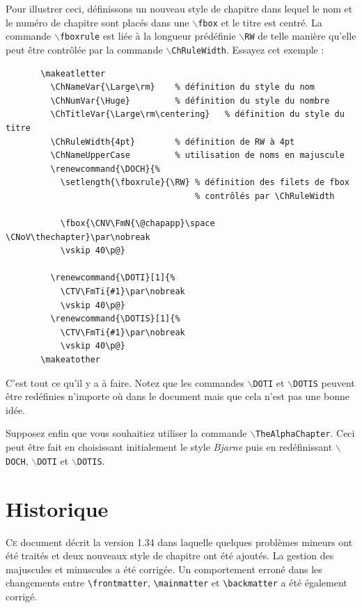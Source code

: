 \documentclass{report}
\newcommand{\A}[1]{{$\backslash${\tt #1}}}
\begin{document}
    Pour illustrer ceci, définissons un nouveau style de chapitre dans lequel
    le nom et le numéro de chapitre sont placés dans une \A{fbox} et le titre
    est centré.
    La commande \A{fboxrule} est liée à la longueur prédéfinie \A{RW} de telle
    manière qu'elle peut être contrôlée par la commande \A{ChRuleWidth}. 
    Essayez cet exemple :
    \begin{verbatim}
       \makeatletter
         \ChNameVar{\Large\rm}    % définition du style du nom
         \ChNumVar{\Huge}         % définition du style du nombre
         \ChTitleVar{\Large\rm\centering}   % définition du style du titre
         \ChRuleWidth{4pt}        % définition de RW à 4pt
         \ChNameUpperCase         % utilisation de noms en majuscule
         \renewcommand{\DOCH}{%
           \setlength{\fboxrule}{\RW} % définition des filets de fbox 
                                      % contrôlés par \ChRuleWidth

           \fbox{\CNV\FmN{\@chapapp}\space \CNoV\thechapter}\par\nobreak
           \vskip 40\p@}

         \renewcommand{\DOTI}[1]{%
           \CTV\FmTi{#1}\par\nobreak
           \vskip 40\p@}
         \renewcommand{\DOTIS}[1]{%
           \CTV\FmTi{#1}\par\nobreak
           \vskip 40\p@}
       \makeatother
    \end{verbatim}

    C'est tout ce qu'il y a à faire. Notez que les commandes \A{DOTI} et
    \A{DOTIS} peuvent être redéfinies n'importe où dans le document mais que 
    cela n'est pas une bonne idée. 

    Supposez enfin que vous souhaitiez utiliser la commande 
    \A{TheAlphaChapter}. Ceci peut être fait en choisissant initialement le
    style \emph{Bjarne} puis en redéfinissant \A{DOCH}, \A{DOTI} et \A{DOTIS}.


  \chapter{Historique}
    \lettrine[findent=0.2em,nindent=0em,realheight=true]{C}{e} 
    document décrit la version 1.34 dans laquelle quelques problèmes mineurs
    ont été traités et deux nouveaux style de chapitre ont été ajoutés. La
    gestion des majuscules et minuscules a été corrigée. Un comportement 
    erroné dans les changements entre \verb+\frontmatter+,
    \verb+\mainmatter+ et \verb+\backmatter+ a été également corrigé.   
\end{document}

